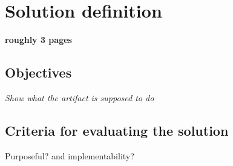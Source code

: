 \chapter{Solution definition} \label{chapter:Solution}
\textbf{roughly 3 pages}

\section{Objectives}
\textit{Show what the artifact is supposed to do}

\section{Criteria for evaluating the solution} \label{sec:CriteriaEvaluation}

Purposeful? and implementability?
